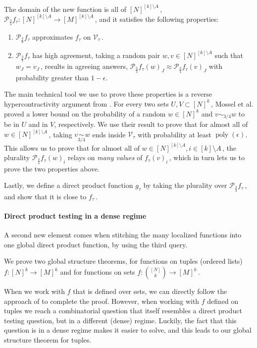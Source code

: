 \documentclass[11pt]{article}
\numberwithin{equation}{section}
\theoremstyle{definition}
\theoremstyle{plain}
\DeclareMathOperator{\poly}{poly} %
\newcommand\f{f} %
\newcommand\pf{g} %
\newcommand{\sets}{\binom{[N]}{k}} %
\newcommand\cons{\mathcal{V}} %
\newcommand\cor[1]{\underset{\scriptscriptstyle#1}{\sim}} %
\begin{document}
The domain of the new function is all of $[N]^{[k]\setminus A}$\,, $\mathcal{P}_\frac{3}{4}f_\tau: [N]^{[k]\setminus A}\rightarrow[M]^{[k]\setminus A}$\,, and it satisfies the following properties:
\begin{enumerate}
	\item $\mathcal{P}_\frac{3}{4}f_\tau$ approximates $f_\tau$ on $\cons_\tau$\,.
	\item $\mathcal{P}_\frac{3}{4}f_\tau$ has high agreement, taking a random pair $w,v\in [N]^{[k]\setminus A}$ such that $w_J=v_J$\,, results in agreeing answers, $\mathcal{P}_\frac{3}{4}f_\tau(w)_J\approx\mathcal{P}_\frac{3}{4}f_\tau(v)_J$ with probability greater than $1-\epsilon$.
\end{enumerate}
The main technical tool we use to prove these properties is a reverse hypercontractivity argument from \cite{mossel2013reverse}. For every two sets $U,V\subset [N]^k$\,, Mossel %
et al.  %
proved a lower bound on the probability of a random $w\in [N]^k$ and $v\sim_{3/4}{w}$ to be in $U$ and 
in %
$V$,   %
 respectively. We use their result to prove that for almost all of $w\in[N]^{[k]\setminus A}$\,, taking $v\cor{3/4}w$ ends inside $\cons_\tau$ with probability at least $\poly(\epsilon)$. This allows us to prove that for almost all of $w\in [N]^{[k]\setminus A},i\in [k]\setminus A$\,, the plurality $\mathcal{P}_\frac{3}{4}f_\tau (w)_i$ relays on \emph{many values} of $f_\tau(v)_i$\,, which in turn lets us to prove the two properties above.

Lastly, we define a direct product function $\pf_\tau$ by taking the plurality over $\mathcal{P}_\frac{3}{4}f_\tau$\,, and show that it is close to $f_\tau$\,.

\paragraph*{Direct product testing in a dense regime}
A second new element comes when stitching the many localized functions into one global direct product function, by using the third query.

We prove two global structure theorems,  for functions on tuples
 (ordered lists) %
$\f:[N]^k\rightarrow[M]^k$ and  for functions on sets $\f:\sets\rightarrow[M]^k$\,.

When we work with $f$ that is defined over sets, we can directly follow the approach of \cite{impagliazzo2012new} to complete the proof. However, when working with $f$ defined on tuples we reach a combinatorial question that itself resembles a direct product testing question, but in a different (dense) regime. Luckily, the fact that this question is in a dense regime makes it easier to solve, and this leads to our global structure theorem for tuples.
\end{document}
